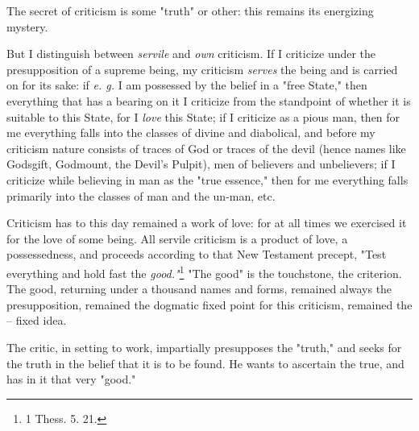 The secret of criticism is some "{}truth"{} or other: this remains its 
energizing mystery.

But I distinguish between \textit{servile} and \textit{own} criticism. If I 
criticize under the presupposition of a supreme being, my criticism 
\textit{serves} the being and is carried on for its sake: if \textit{e. g.} I 
am possessed by the belief in a "{}free State,"{} then everything that has a 
bearing on it I criticize from the standpoint of whether it is suitable to 
this State, for I \textit{love} this State; if I criticize as a pious man, 
then for me everything falls into the classes of divine and diabolical, and 
before my criticism nature consists of traces of God or traces of the devil 
(hence names like Godsgift, Godmount, the Devil's Pulpit), men of believers 
and unbelievers; if I criticize while believing in man as the "{}true 
essence,"{} then for me everything falls primarily into the classes of man and 
the un-man, etc.

Criticism has to this day remained a work of love: for at all times we 
exercised it for the love of some being. All servile criticism is a product of 
love, a possessedness, and proceeds according to that New Testament precept, 
"{}Test everything and hold fast the \textit{good."{}}\footnote{1 Thess. 5. 
21.} "{}The good"{} is the touchstone, the criterion. The good, returning 
under a thousand names and forms, remained always the presupposition, remained 
the dogmatic fixed point for this criticism, remained the -- fixed idea.

The critic, in setting to work, impartially presupposes the "{}truth,"{} and 
seeks for the truth in the belief that it is to be found. He wants to 
ascertain the true, and has in it that very "{}good."{}

